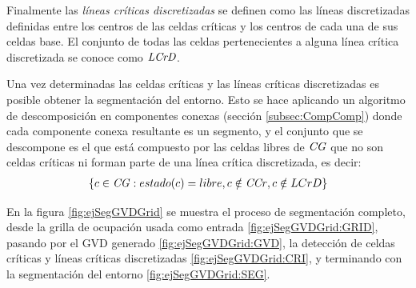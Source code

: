 
Finalmente las \emph{líneas críticas discretizadas} se definen como las líneas
discretizadas \cite{foleyphillips} definidas entre los centros de las celdas
críticas y los centros de cada una de sus celdas base. El conjunto de todas las
celdas pertenecientes a alguna línea crítica discretizada se conoce como
$\mathit{LCrD}$.

Una vez determinadas las celdas críticas y las líneas críticas discretizadas es
posible obtener la segmentación del entorno. Esto se hace aplicando un
algoritmo de descomposición en componentes conexas (sección
\ref{subsec:CompComp}) donde cada componente conexa resultante es un segmento, y
el conjunto que se descompone es el que está compuesto
por las celdas libres de $\mathit{CG}$ que no son celdas críticas ni forman parte
de una línea crítica discretizada, es decir:
\begin{align*}
\{ c \in \mathit{CG} : estado(c) = libre, c \notin \mathit{CCr}, c \notin{LCrD}\}
\end{align*}

En la figura \ref{fig:ejSegGVDGrid} se muestra el proceso de segmentación
completo, desde la grilla de ocupación usada como entrada
\ref{fig:ejSegGVDGrid:GRID}, pasando por el GVD generado
\ref{fig:ejSegGVDGrid:GVD}, la detección de celdas críticas y líneas críticas discretizadas
\ref{fig:ejSegGVDGrid:CRI}, y terminando con la segmentación del entorno
\ref{fig:ejSegGVDGrid:SEG}.

